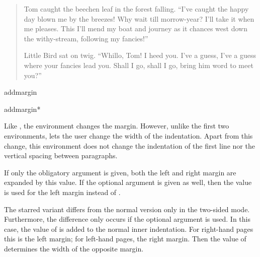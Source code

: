 \begin{Example}
\begin{ShowOutput}
\begin{quote}
          Tom caught the beechen leaf in the forest falling.
          ``I've caught the happy day blown me by the breezes!
          Why wait till morrow-year? I'll take it when me pleases.
          This I'll mend my boat and journey as it chances
          west down the withy-stream, following my fancies!''

          Little Bird sat on twig. ``Whillo, Tom! I heed you.
          I've a guess, I've a guess where your fancies lead you.
          Shall I go, shall I go, bring him word to meet you?''
        \end{quote}
      \end{ShowOutput}
    \end{Example}
  \fi
  \EndIndexGroup
\fi

\begin{Declaration}
  \begin{Environment}{addmargin}
  \end{Environment}
  \begin{Environment}{addmargin*}
  \end{Environment}
\end{Declaration}
Like , the  environment changes the margin.
However, unlike the first two environments,  lets the
user change the width of the indentation. Apart from this change, this
environment does not change the indentation of the first line nor the vertical
spacing between paragraphs.

If only the obligatory argument  is given, both the left
and right margin are expanded by this value. If the optional argument
 is given as well, then the value  is used for the left margin instead of .

The starred variant %
 differs from the normal version only in
the two-sided mode. Furthermore, the difference only occurs if the optional
argument  is used. In this case, the value of
 is added to the normal inner indentation. For
right-hand pages this is the left margin; for left-hand pages, the right
margin. Then the value of  determines the width of the
opposite margin.

